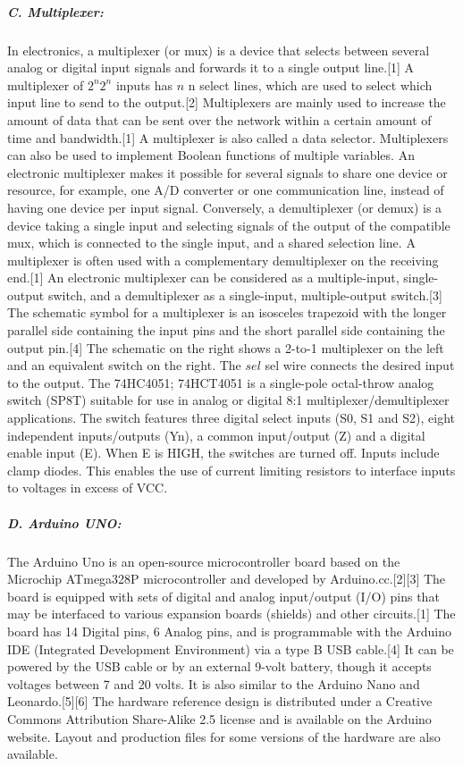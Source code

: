 \subparagraph{C. Multiplexer: }
In electronics, a multiplexer (or mux) is a device that selects between several analog 
or digital input signals and forwards it to a single output line.[1] A multiplexer of 
${\displaystyle 2^{n}} 2^{n}$ inputs has ${\displaystyle n}$ n select lines, which are 
used to select which input line to send to the output.[2] Multiplexers are mainly used 
to increase the amount of data that can be sent over the network within a certain amount 
of time and bandwidth.[1] A multiplexer is also called a data selector. Multiplexers can 
also be used to implement Boolean functions of multiple variables.
An electronic multiplexer makes it possible for several signals to share one device or 
resource, for example, one A/D converter or one communication line, instead of having one 
device per input signal.
Conversely, a demultiplexer (or demux) is a device taking a single input and selecting 
signals of the output of the compatible mux, which is connected to the single input, and 
a shared selection line. A multiplexer is often used with a complementary demultiplexer 
on the receiving end.[1]
An electronic multiplexer can be considered as a multiple-input, single-output switch, 
and a demultiplexer as a single-input, multiple-output switch.[3] The schematic symbol 
for a multiplexer is an isosceles trapezoid with the longer parallel side containing the 
input pins and the short parallel side containing the output pin.[4] The schematic on the 
right shows a 2-to-1 multiplexer on the left and an equivalent switch on the right. 
The ${\displaystyle sel}$ sel wire connects the desired input to the output.
The 74HC4051; 74HCT4051 is a single-pole octal-throw analog switch (SP8T) suitable for 
use in analog or digital 8:1 multiplexer/demultiplexer applications. The switch features 
three digital select inputs (S0, S1 and S2), eight independent inputs/outputs (Yn), a 
common input/output (Z) and a digital enable input (E). When E is HIGH, the switches are 
turned off. Inputs include clamp diodes. This enables the use of current limiting resistors 
to interface inputs to voltages in excess of VCC.

\subparagraph{D. Arduino UNO: }
The Arduino Uno is an open-source microcontroller board based on the Microchip ATmega328P 
microcontroller and developed by Arduino.cc.[2][3] The board is equipped with sets of digital 
and analog input/output (I/O) pins that may be interfaced to various expansion boards (shields) 
and other circuits.[1] The board has 14 Digital pins, 6 Analog pins, and is programmable with 
the Arduino IDE (Integrated Development Environment) via a type B USB cable.[4] It can be 
powered by the USB cable or by an external 9-volt battery, though it accepts voltages between 
7 and 20 volts. It is also similar to the Arduino Nano and Leonardo.[5][6] The hardware 
reference design is distributed under a Creative Commons Attribution Share-Alike 2.5 license 
and is available on the Arduino website. Layout and production files for some versions of 
the hardware are also available.

